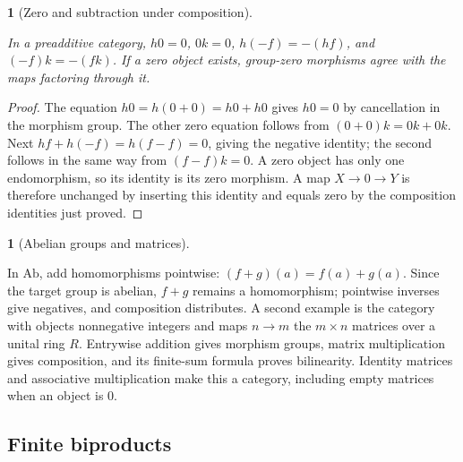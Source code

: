 \documentclass[11pt,a4paper]{article}
\newcommand{\mathheading}{}
\theoremstyle{plain}
\newtheorem*{plainstatement}{\mathheading}
\theoremstyle{definition}
\newtheorem*{definitionstatement}{\mathheading}
\newenvironment{mathstatement}[3]{\renewcommand{\mathheading}{#1 #2}\begin{plainstatement}[#3]}{\end{plainstatement}}
\newenvironment{mathdefinition}[3]{\renewcommand{\mathheading}{#1 #2}\begin{definitionstatement}[#3]}{\end{definitionstatement}}
\begin{document}
\begin{mathstatement}{Proposition}{3.2}{Zero and subtraction under composition}
\label{env-3-2}

In a preadditive category, \(h0=0\), \(0k=0\), \(h(-f)=-(hf)\), and \((-f)k=-(fk)\). If a zero object exists, group-zero morphisms agree with the maps factoring through it.


\par{}\par

\end{mathstatement}
 
\begin{proof}

The equation \(h0=h(0+0)=h0+h0\) gives \(h0=0\) by cancellation in the morphism group. The other zero equation follows from \((0+0)k=0k+0k\). Next \(hf+h(-f)=h(f-f)=0\), giving the negative identity; the second follows in the same way from \((f-f)k=0\). A zero object has only one endomorphism, so its identity is its zero morphism. A map \(X\to0\to Y\) is therefore unchanged by inserting this identity and equals zero by the composition identities just proved.


\end{proof}
 
\begin{mathdefinition}{Example}{3.3}{Abelian groups and matrices}
\label{env-3-3}

In \(\mathrm{Ab}\), add homomorphisms pointwise: \((f+g)(a)=f(a)+g(a)\). Since the target group is abelian, \(f+g\) remains a homomorphism; pointwise inverses give negatives, and composition distributes. A second example is the category with objects nonnegative integers and maps \(n\to m\) the \(m\times n\) matrices over a unital ring \(R\). Entrywise addition gives morphism groups, matrix multiplication gives composition, and its finite-sum formula proves bilinearity. Identity matrices and associative multiplication make this a category, including empty matrices when an object is \(0\).


\par{}\par

\end{mathdefinition}
 
\subsection{Finite biproducts}
\end{document}
